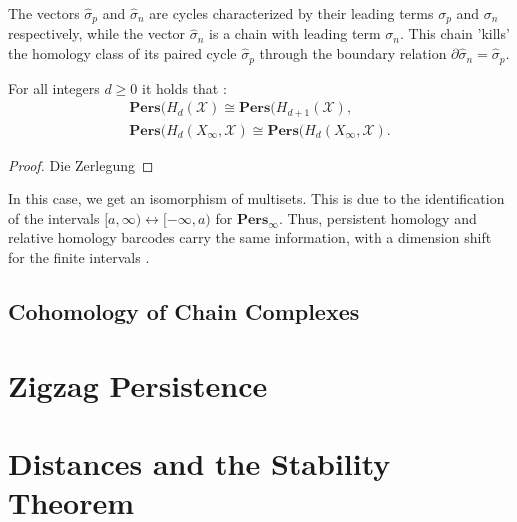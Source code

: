 The vectors $\hat{\sigma}_{p}$ and $\hat{\sigma}_{n}$ are cycles characterized by
their leading terms $\sigma_{p}$ and $\sigma_{n}$ respectively, while the vector
$\hat{\sigma}_{n}$ is a chain with leading term $\sigma_{n}$. This chain 'kills'
the homology class of its paired cycle $\hat{\sigma}_{p}$ through the boundary relation
$\partial \hat{\sigma}_{n} = \hat{\sigma}_{p}$.

\begin{theorem}
	For all integers $d \geq 0$ it holds that \cite[\S 2.4]{de2011dualities}:
	\begin{align*}
		\textbf{Pers}(H_{d}(\mathcal{X}) \cong \textbf{Pers}(H_{d+1}(\mathcal{X}),                       \\
		\textbf{Pers}(H_{d}(X_{\infty}, \mathcal{X}) \cong \textbf{Pers}(H_{d}(X_{\infty}, \mathcal{X}).
	\end{align*}
\end{theorem}

\begin{proof}
	Die Zerlegung
\end{proof}

\begin{remark}
	In this case, we get an isomorphism of multisets. This is due to the identification
	of the intervals $[a,\infty) \leftrightarrow [-\infty, a)$ for $\textbf{Pers}_{\infty}$.
	Thus, persistent homology and relative homology barcodes carry the same information,
	with a dimension shift for the finite intervals \cite[\S 2.4]{de2011dualities}.
\end{remark}

\subsection{Cohomology of Chain Complexes}

\section{Zigzag Persistence}
\section{Distances and the Stability Theorem}

\begin{theorem}
\label{stability}

\end{theorem}


